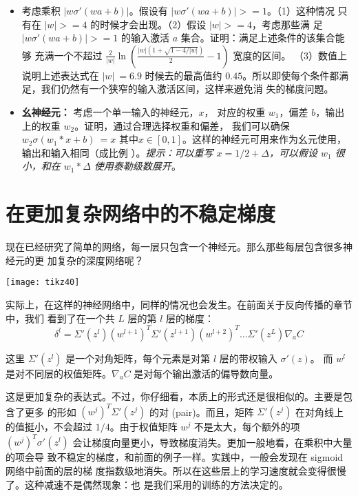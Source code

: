 \begin{itemize}
\item 考虑乘积 $|w\sigma'(wa+b)|$。假设有 $|w\sigma'(wa+b)| >= 1$。（1）这种情况
  只有在 $|w| >= 4$ 的时候才会出现。（2）假设 $|w| >= 4$，考虑那些满
  足 $|w\sigma'(wa+b)| >= 1$ 的输入激活 $a$ 集合。证明：满足上述条件的该集合能够
  充满一个不超过 $\frac{2}{|w|}\ln(\frac{|w|(1+\sqrt{1-4/|w|})}{2}-1)$ 宽度的区间。
  （3）数值上说明上述表达式在 $|w| ~= 6.9$ 时候去的最高值约
  $0.45$。所以即使每个条件都满足，我们仍然有一个狭窄的输入激活区间，这样来避免消
  失的梯度问题。
\item \textbf{幺神经元：}\label{identity_neuron} 考虑一个单一输入的神经元，$x$，
  对应的权重 $w_1$，偏差 $b$，输出上的权重 $w_2$。证明，通过合理选择权重和偏差，
  我们可以确保 $w_2 \sigma(w_1*x +b)~=x$
  其中$x \in [0, 1]$。这样的神经元可用来作为幺元使用，输出和输入相同（成比例
  ）。\emph{提示：可以重写 $x = 1/2 + \Delta$，可以假设 $w_1$ 很小，和在 $w_1 *
    \Delta$ 使用泰勒级数展开}。
\end{itemize}

\section{在更加复杂网络中的不稳定梯度}

现在已经研究了简单的网络，每一层只包含一个神经元。那么那些每层包含很多神经元的更
加复杂的深度网络呢？
\begin{center}
  \texttt{[image: tikz40]}
\end{center}
 
实际上，在这样的神经网络中，同样的情况也会发生。在前面关于反向传播的章节中，我们
看到了在一个共 $L$ 层的第 $l$ 层的梯度：
\begin{equation}
  \delta^l = \Sigma'(z^l) (w^{l+1})^T \Sigma'(z^{l+1}) (w^{l+2})^T \ldots
  \Sigma'(z^L) \nabla_a C
  \label{eq:124}\tag{124}
\end{equation}

这里 $\Sigma'(z^l)$ 是一个对角矩阵，每个元素是对第 $l$ 层的带权输入 $\sigma'(z)$。
而 $w^l$ 是对不同层的权值矩阵。$\nabla_{a} C$ 是对每个输出激活的偏导数向量。
 
这是更加复杂的表达式。不过，你仔细看，本质上的形式还是很相似的。主要是包含了更多
的形如 $(w^j)^T \Sigma' (z^j)$ 的对 (pair)。而且，矩阵 $\Sigma'(z^j)$ 在对角线上
的值挺小，不会超过 $1/4$。由于权值矩阵 $w^j$ 不是太大，每个额外的项 $(w^j)^T
\sigma' (z^l)$ 会让梯度向量更小，导致梯度消失。更加一般地看，在乘积中大量的项会导
致不稳定的梯度，和前面的例子一样。实践中，一般会发现在 sigmoid网络中前面的层的梯
度指数级地消失。所以在这些层上的学习速度就会变得很慢了。这种减速不是偶然现象：也
是我们采用的训练的方法决定的。

